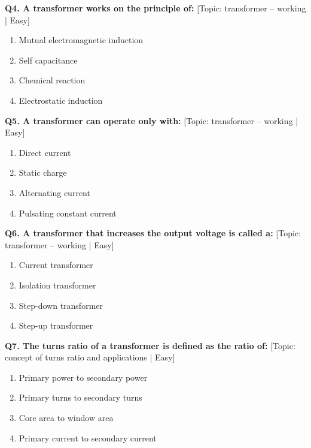 \noindent\textbf{Q4. A transformer works on the principle of:} \hfill [Topic: transformer -- working | Easy]
\begin{enumerate}[label=(\alph*),topsep=2pt,itemsep=1pt,partopsep=0pt,parsep=0pt]
    \item {Mutual electromagnetic induction}
    \item {Self capacitance}
    \item {Chemical reaction}
    \item {Electrostatic induction}
\end{enumerate}
\vspace{2mm}

\noindent\textbf{Q5. A transformer can operate only with:} \hfill [Topic: transformer -- working | Easy]
\begin{enumerate}[label=(\alph*),topsep=2pt,itemsep=1pt,partopsep=0pt,parsep=0pt]
    \item {Direct current}
    \item {Static charge}
    \item {Alternating current}
    \item {Pulsating constant current}
\end{enumerate}
\vspace{2mm}

\noindent\textbf{Q6. A transformer that increases the output voltage is called a:} \hfill [Topic: transformer -- working | Easy]
\begin{enumerate}[label=(\alph*),topsep=2pt,itemsep=1pt,partopsep=0pt,parsep=0pt]
    \item {Current transformer}
    \item {Isolation transformer}
    \item {Step-down transformer}
    \item {Step-up transformer}
\end{enumerate}
\vspace{2mm}

\noindent\textbf{Q7. The turns ratio of a transformer is defined as the ratio of:} \hfill [Topic: concept of turns ratio and applications | Easy]
\begin{enumerate}[label=(\alph*),topsep=2pt,itemsep=1pt,partopsep=0pt,parsep=0pt]
    \item {Primary power to secondary power}
    \item {Primary turns to secondary turns}
    \item {Core area to window area}
    \item {Primary current to secondary current}
\end{enumerate}
\vspace{2mm}

